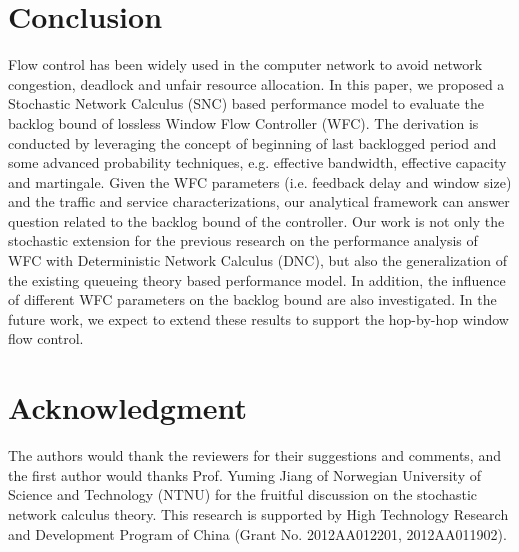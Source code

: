 \documentclass[12pt]{article}
\begin{document}
\section{Conclusion}\label{concluson}
Flow control has been widely used in the computer network to avoid network congestion, deadlock and unfair resource allocation. In this paper, we proposed a Stochastic Network Calculus (SNC) based performance model to evaluate the backlog bound of lossless Window Flow Controller (WFC). The derivation is conducted by leveraging the concept of beginning of last backlogged period and some advanced probability techniques, e.g. effective bandwidth, effective capacity and martingale. Given the WFC parameters (i.e. feedback delay and window size) and the traffic and service characterizations, our analytical framework can answer question related to the backlog bound of the controller. Our work is not only the stochastic extension for the previous research on the performance analysis of WFC with Deterministic Network Calculus (DNC), but also the generalization of the existing queueing theory based performance model. In addition, the influence of different WFC parameters on the backlog bound are also investigated. In the future work, we expect to extend these results to support the hop-by-hop window flow control.

\section*{Acknowledgment}
The authors would thank the reviewers for their suggestions and comments, and the first author would thanks Prof. Yuming Jiang of Norwegian University of Science and Technology (NTNU) for the fruitful discussion on the stochastic network calculus theory. This research is supported by High Technology Research and Development Program of China (Grant No. 2012AA012201, 2012AA011902).

\end{document}

